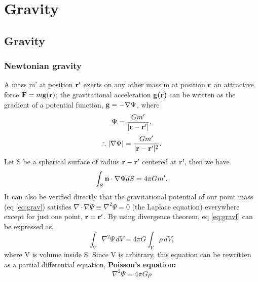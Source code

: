 \chapter{Gravity}

\section{Gravity}
\subsection{Newtonian gravity}
A mass m' at position ${\bf r}'$ exerts on any other mass m at position ${\bf r}$ an attractive
force ${\bf F}=m {\bf g}({\bf r})$; the gravitational acceleration {\bf g(r)} can be written as the 
gradient of a potential function, ${\bf g} = -\nabla \Psi$, where
\begin{equation}\label{eq:grav}
   \Psi = \frac{G m'}{|{\bf r} - {\bf r}'|},
\end{equation}
\begin{equation}\label{eq:gravf}
   \therefore |\nabla \Psi| = \frac{G m'}{|{\bf r} - {\bf r}'|^2}.
\end{equation}
Let S be a spherical surface of radius ${{\bf r} - {\bf r}'}$ centered at {\bf r'}, then we have
\begin{equation}
   \int_{S} {\bf n} \cdot \nabla \Psi dS = 4 \pi G m'.
\end{equation}
It can also be verified directly that the gravitational potential of our point mass (eq 
\ref{eq:grav}) satisfies $\nabla \cdot \nabla \Psi \equiv \nabla^2 \Psi = 0$ (the Laplace equation)
everywhere except for just one point, ${\bf r}={\bf r}'$. By using divergence theorem, eq \ref{eq:gravf} can 
be expressed as,
\begin{equation}\label{eq:poisson}
   \int_{V} \nabla^2 \Psi\, dV = 4 \pi G \int_{V} \rho \,dV,
\end{equation}
where V is volume inside S. Since V is arbitrary, this equation can be rewritten as a 
partial differential equation, {\bf Poisson's equation:}
\begin{equation}
   \nabla^2 \Psi = 4 \pi G \rho
\end{equation}

\bigskip
